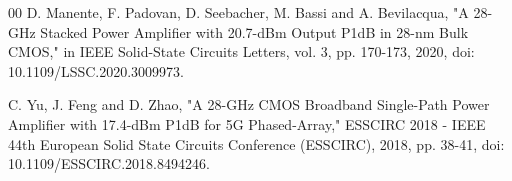 \documentclass{IEEEtran}
\begin{document}
\begin{thebibliography}{00}
D. Manente, F. Padovan, D. Seebacher, M. Bassi and A. Bevilacqua, "A 28-GHz Stacked Power Amplifier with 20.7-dBm Output P1dB in 28-nm Bulk CMOS," in IEEE Solid-State Circuits Letters, vol. 3, pp. 170-173, 2020, doi: 10.1109/LSSC.2020.3009973.

C. Yu, J. Feng and D. Zhao, "A 28-GHz CMOS Broadband Single-Path Power Amplifier with 17.4-dBm P1dB for 5G Phased-Array," ESSCIRC 2018 - IEEE 44th European Solid State Circuits Conference (ESSCIRC), 2018, pp. 38-41, doi: 10.1109/ESSCIRC.2018.8494246.











\end{thebibliography}
\end{document}
